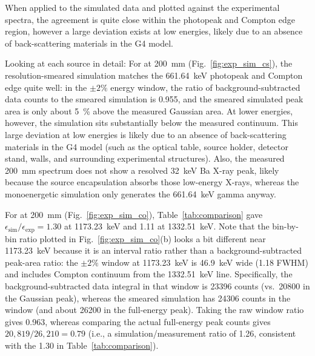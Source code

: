 \documentclass[11pt,a4paper]{article}
\begin{document}
When applied to the simulated data and plotted against the experimental spectra, the agreement is quite close within the photopeak and Compton edge region, however a large deviation exists at low energies, likely due to an absence of back-scattering materials in the G4 model.

Looking at each source in detail:
For  at \SI{200}{mm} (Fig.~\ref{fig:exp_sim_cs}), the resolution-smeared simulation matches the \SI{661.64}{keV} photopeak and Compton edge quite well: in the \(\pm2\%\) energy window, the ratio of background-subtracted data counts to the smeared simulation is 0.955, and the smeared simulated peak area is only about \SI{5}{\percent} above the measured Gaussian area. At lower energies, however, the simulation sits substantially below the measured continuum. This large deviation at low energies is likely due to an absence of back-scattering materials in the G4 model (such as the optical table, source holder, detector stand, walls, and surrounding experimental structures). Also, the measured \SI{200}{mm}  spectrum does not show a resolved \SI{32}{keV} Ba X-ray peak, likely because the source encapsulation absorbs those low-energy X-rays, whereas the monoenergetic simulation only generates the \SI{661.64}{keV} gamma anyway.

For  at \SI{200}{mm} (Fig.~\ref{fig:exp_sim_co}), Table~\ref{tab:comparison} gave $\epsilon_{\mathrm{sim}}/\epsilon_{\mathrm{exp}}=1.30$ at \SI{1173.23}{keV} and 1.11 at \SI{1332.51}{keV}. Note that the bin-by-bin ratio plotted in Fig.~\ref{fig:exp_sim_co}(b) looks a bit different near \SI{1173.23}{keV} because it is an interval ratio rather than a background-subtracted peak-area ratio: the \(\pm2\%\) window at \SI{1173.23}{keV} is \SI{46.9}{keV} wide (\num{1.18} FWHM) and includes Compton continuum from the \SI{1332.51}{keV} line. Specifically, the background-subtracted data integral in that window is \num{23396} counts (vs.\ \num{20800} in the Gaussian peak), whereas the smeared simulation has \num{24306} counts in the window (and about \num{26200} in the full-energy peak). Taking the raw window ratio gives \num{0.963}, whereas comparing the actual full-energy peak counts gives $20{,}819/26{,}210=0.79$ (i.e., a simulation/measurement ratio of \num{1.26}, consistent with the 1.30 in Table~\ref{tab:comparison}).
\end{document}
